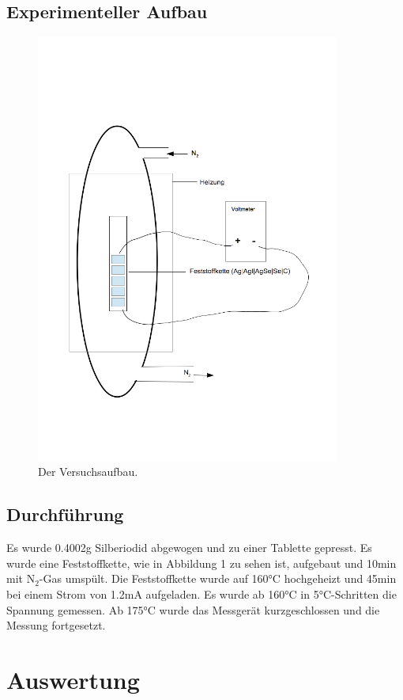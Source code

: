 \documentclass[12pt,a4paper,titlepage,headinclude,bibtotoc]{scrartcl}
\begin{document}
\subsection{Experimenteller Aufbau}
\begin{figure}[h]
\centering
\includegraphics[width=10cm]{VB.png}
\caption{Der Versuchsaufbau.}
\end{figure} 
\FloatBarrier
\subsection{Durchführung}
Es wurde 0.4002\;g Silberiodid abgewogen und zu einer Tablette gepresst. Es wurde eine Feststoffkette, wie in Abbildung 1 zu sehen ist, aufgebaut und 10\;min mit $\text{N}_2$-Gas umspült. Die Feststoffkette wurde auf 160\;°C hochgeheizt und 45\;min bei einem Strom von 1.2\;mA aufgeladen. Es wurde ab 160\;°C in 5\;°C-Schritten die Spannung gemessen. Ab 175\;°C wurde das Messgerät kurzgeschlossen und die Messung fortgesetzt. 
\section{Auswertung}
\end{document}
